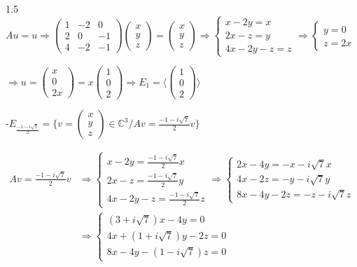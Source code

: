 \documentclass[12pt]{article}
\begin{document}
\begin{spacing}{1.5}
$Au=u\Rightarrow \begin{pmatrix}
 1 & -2 & 0 \\ 
 2 & 0 & -1 \\ 
 4 & -2 & -1
 \end{pmatrix}\begin{pmatrix}
x\\
y\\
z
\end{pmatrix}=\begin{pmatrix}
x\\
y\\
z
\end{pmatrix}\Rightarrow \begin{cases}
x-2y=x\\
2x-z=y\\
4x-2y-z=z
\end{cases}\Rightarrow \begin{cases}
y=0\\
z=2x
\end{cases}$

$\Rightarrow u=\begin{pmatrix}
x\\
0\\
2x
\end{pmatrix}=x\begin{pmatrix}
1\\
0\\
2
\end{pmatrix}\Rightarrow E_1=\langle\begin{pmatrix}
1\\
0\\
2
\end{pmatrix}\rangle$

\medskip
-$E_{\frac{-1-i\sqrt{7}}{2}}=\{v=\begin{pmatrix}
x\\
y\\
z
\end{pmatrix}\in \mathbb{C}^3/Av=\frac{-1-i\sqrt{7}}{2}v\}$

\begin{align*}
Av=\frac{-1-i\sqrt{7}}{2}v &\Rightarrow \begin{cases}
x-2y=\frac{-1-i\sqrt{7}}{2}x\\
2x-z=\frac{-1-i\sqrt{7}}{2}y\\
4x-2y-z=\frac{-1-i\sqrt{7}}{2}z
\end{cases}\Rightarrow\begin{cases}
2x-4y=-x-i\sqrt{7}x\\
4x-2z=-y-i\sqrt{7}y\\
8x-4y-2z=-z-i\sqrt{7}z
\end{cases}\\
&\Rightarrow \begin{cases}
(3+i\sqrt{7})x-4y=0\\
4x+(1+i\sqrt{7})y-2z=0\\
8x-4y-(1-i\sqrt{7})z=0
\end{cases}
\end{align*}


\end{spacing}
\end{document}
